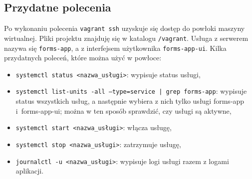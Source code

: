 \subsection{Przydatne polecenia}
Po wykonaniu polecenia \texttt{vagrant ssh} uzyskuje się dostęp do powłoki maszyny wirtualnej.
Pliki projektu znajduję się w katalogu \texttt{/vagrant}. Usługa z serwerem nazywa się 
\texttt{forms-app}, a z interfejsem użytkownika \texttt{forms-app-ui}. Kilka przydatnych poleceń, 
które można użyć w powłoce:
\begin{itemize}
  \item \texttt{systemctl status <nazwa\_usługi>}: wypisuje status usługi,
  \item \texttt{systemctl list-units -all --type=service | grep forms-app}: wypisuje\\
    status wszystkich usług, a następnie wybiera z nich tylko usługi forms-app i~forms-app-ui;
    można w ten sposób sprawdzić, czy usługi są aktywne, 
  \item \texttt{systemctl start <nazwa\_usługi>}: włącza usługę,
  \item \texttt{systemctl stop <nazwa\_usługi>}: zatrzymuje usługę,
  \item \texttt{journalctl -u <nazwa\_usługi>}: wypisuje logi usługi razem z logami aplikacji.
\end{itemize}